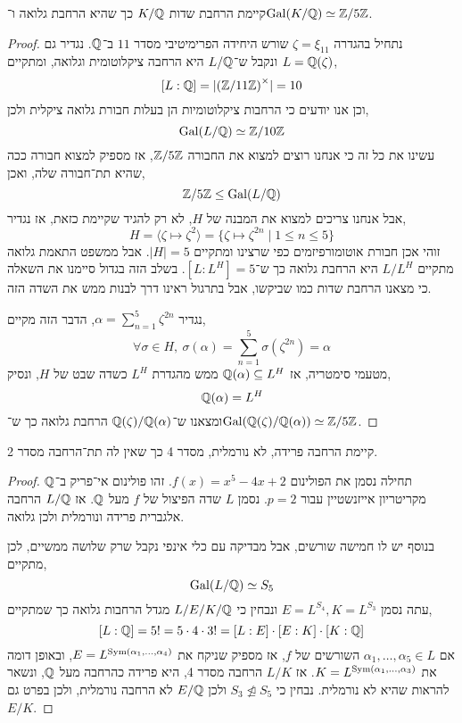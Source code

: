 



\begin{proposition}
	קיימת הרחבת שדות $K / \mathbb{Q}$ כך שהיא הרחבת גלואה ו־$\operatorname{Gal}(K / \mathbb{Q}) \simeq \mathbb{Z} / 5\mathbb{Z}$.
\end{proposition}
\begin{proof}
	נתחיל בהגדרה $\zeta = \xi_{11}$ שורש היחידה הפרימיטיבי מסדר $11$ ב־$\mathbb{Q}$.
	נגדיר גם $L = \mathbb{Q}(\zeta)$ ונקבל ש־$L / \mathbb{Q}$ היא הרחבה ציקלוטומית וגלואה, ומתקיים,
	\[
		[L : \mathbb{Q}]
		= | {(\mathbb{Z} / 11\mathbb{Z})}^\times |
		= 10
	\]
	וכן אנו יודעים כי הרחבות ציקלוטומיות הן בעלות חבורת גלואה ציקלית ולכן,
	\[
		\operatorname{Gal}(L / \mathbb{Q})
		\simeq \mathbb{Z} / 10\mathbb{Z}
	\]
	עשינו את כל זה כי אנחנו רוצים למצוא את החבורה $\mathbb{Z} / 5\mathbb{Z}$, אז מספיק למצוא חבורה ככה שהיא תת־חבורה שלה, ואכן,
	\[
		\mathbb{Z} / 5\mathbb{Z}
		\le \operatorname{Gal}(L / \mathbb{Q})
	\]
	אבל אנחנו צריכים למצוא את המבנה של $H$, לא רק להגיד שקיימת כזאת, אז נגדיר,
	\[
		H
		= \langle \zeta \mapsto \zeta^2 \rangle
		= \{ \zeta \mapsto \zeta^{2 n} \mid 1 \le n \le 5 \}
	\]
	זוהי אכן חבורת אוטומורפיזמים כפי שרצינו ומתקיים $|H| = 5$.
	אבל ממשפט התאמת גלואה מתקיים $L / L^H$ היא הרחבת גלואה כך ש־$[L : L^H] = 5$.
	בשלב הזה בגדול סיימנו את השאלה כי מצאנו הרחבת שדות כמו שביקשו, אבל בתרגול ראינו דרך לבנות ממש את השדה הזה.

	נגדיר $\alpha = \sum_{n = 1}^5 \zeta^{2 n}$, הדבר הזה מקיים,
	\[
		\forall \sigma \in H,\ 
		\sigma(\alpha)
		= \sum_{n = 1}^5 \sigma(\zeta^{2 n})
		= \alpha
	\]
	מטעמי סימטריה, אז $\mathbb{Q}(\alpha) \subseteq L^H$ ממש מהגדרת $L^H$ כשדה שבט של $H$, ונסיק,
	\[
		\mathbb{Q}(\alpha) = L^H
	\]
	ומצאנו ש־$\mathbb{Q}(\zeta) / \mathbb{Q}(\alpha)$ הרחבת גלואה כך ש־$\operatorname{Gal}(\mathbb{Q}(\zeta) / \mathbb{Q}(\alpha)) \simeq \mathbb{Z} / 5\mathbb{Z}$.
\end{proof}

\begin{proposition}
	קיימת הרחבה פרידה, לא נורמלית, מסדר 4 כך שאין לה תת־הרחבה מסדר 2.
\end{proposition}
\begin{proof}
	תחילה נסמן את הפולינום $f(x) = x^5 - 4x + 2$.
	זהו פולינום אי־פריק ב־$\mathbb{Q}$ מקריטריון אייזנשטיין עבור $p = 2$.
	נסמן $L$ שדה הפיצול של $f$ מעל $\mathbb{Q}$.
	אז $L / \mathbb{Q}$ הרחבה אלגברית פרידה ונורמלית ולכן גלואה.

	בנוסף יש לו חמישה שורשים, אבל מבדיקה עם כלי אינפי נקבל שרק שלושה ממשיים, לכן מתקיים,
	\[
		\operatorname{Gal}(L / \mathbb{Q})
		\simeq S_5
	\]
	עתה נסמן $E = L^{S_4}, K = L^{S_3}$ ונבחין כי $L / E / K / \mathbb{Q}$ מגדל הרחבות גלואה כך שמתקיים,
	\[
		[L : \mathbb{Q}]
		= 5!
		= 5 \cdot 4 \cdot 3!
		= [L : E] \cdot [E : K] \cdot [K : \mathbb{Q}]
	\]
	אם $\alpha_1, \ldots, \alpha_5 \in L$ השורשים של $f$, אז מספיק שניקח את $E = L^{\operatorname{Sym}(\alpha_1, \ldots, \alpha_4)}$, ובאופן דומה את $K = L^{\operatorname{Sym}(\alpha_1, \ldots, \alpha_3)}$.
	אז $L / K$ הרחבה מסדר 4, היא פרידה כהרחבה מעל $\mathbb{Q}$, ונשאר להראות שהיא לא נורמלית.
	נבחין כי $S_3 \not\trianglelefteq S_5$ ולכן $E / \mathbb{Q}$ לא הרחבה נורמלית, ולכן בפרט גם $E / K$.
\end{proof}


